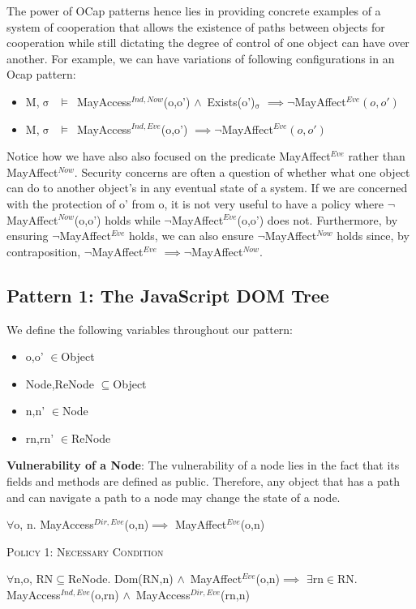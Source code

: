 \documentclass[a4paper,11pt, twoside,twocolumn]{article}
\newenvironment{logic}[1][null]
{\begin{flushleft} \small \label{#1}}
{\end{flushleft}}
\newcommand{\loin}{$\in$}
\newcommand{\loforall}{$\forall$}
\newcommand{\loexists}{$\exists$}
\newcommand{\loand}{$\land$}
\newcommand{\losubseteq}{$\subseteq$}
\newcommand{\loimplies}{$\implies$}
\newcommand{\losigma}{$\upsigma$}
\newcommand{\loturns} {$\vDash$}
\newcommand{\loneg}{$\neg$}
\newcommand{\ablock} {\null\qquad}
\begin{document}
The power of OCap patterns hence lies in providing concrete examples of a system of cooperation that allows the existence of paths between objects for cooperation while still dictating the degree of control of one object can have over another. For example, we can have variations of following configurations in an Ocap pattern:
\begin{itemize}\raggedright \small
\item M,\losigma\ \loturns\ MayAccess$^{Ind,Now}$(o,o') \loand\ Exists(o')$_\text{\losigma}$
\loimplies \loneg MayAffect$^{Eve}(o,o')$
\item M,\losigma\ \loturns\ MayAccess$^{Ind,Eve}$(o,o') \linebreak 
\loimplies \loneg MayAffect$^{Eve}(o,o')$
\end{itemize}

Notice how we have also also focused on the predicate MayAffect$^{Eve}$ rather than MayAffect$^{Now}$. Security concerns are often a question of whether what one object can do to another object's in any eventual state of a system. If we are concerned with the protection of o' from o, it is not very useful to have a policy where \loneg MayAffect$^{Now}$(o,o') holds while \loneg MayAffect$^{Eve}$(o,o') does not. Furthermore, by ensuring \loneg MayAffect$^{Eve}$ holds, we can also ensure \loneg MayAffect$^{Now}$ holds since, by contraposition, \loneg MayAffect$^{Eve}$ \loimplies \loneg MayAffect$^{Now}$.
\subsection{Pattern 1: The JavaScript DOM Tree}
We define the following variables throughout our pattern:
\begin{itemize}
\item o,o' \loin Object
\item Node,ReNode \losubseteq Object
\item n,n' \loin Node
\item rn,rn' \loin ReNode
\end{itemize}
\textbf{Vulnerability of a Node}:
The vulnerability of a node lies in the fact that its fields and methods are defined as public. Therefore, any object that has a path and can navigate a path to a node may change the state of a node.

\begin{logic}[DomP1]
\loforall o, n. MayAccess$^{Dir,Eve}$(o,n)\linebreak \ablock\ablock \loimplies \linebreak
\ablock \ablock MayAffect$^{Eve}$(o,n)\linebreak
\end{logic}
\textsc{Policy 1: Necessary Condition}
\begin{logic}[NodeP1]
\loforall n,o, RN\losubseteq ReNode.\linebreak
Dom(RN,n) \loand\ MayAffect$^{Eve}$(o,n)\linebreak \ablock\loimplies \linebreak
\ablock \loexists rn\loin RN. MayAccess$^{Ind,Eve}$(o,rn)\linebreak
\ablock \ablock \ablock\loand\ MayAccess$^{Dir,Eve}$(rn,n)
\end{logic}
\end{document}
